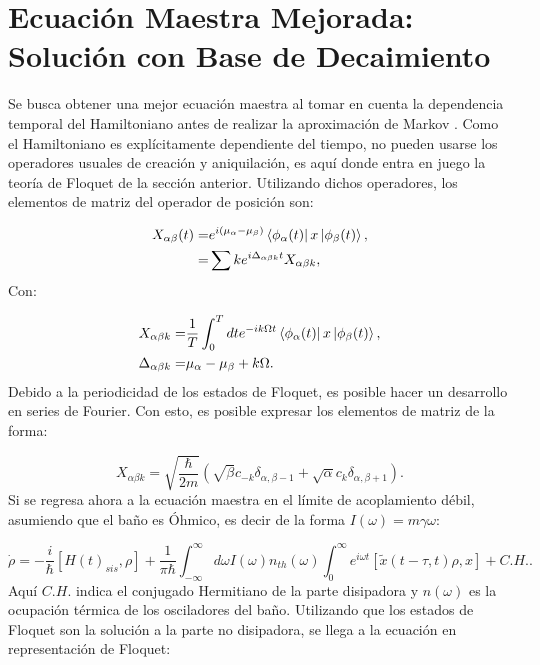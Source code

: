 \documentclass[a4paper,10pt]{report}
\begin{document}
\section{Ecuación Maestra Mejorada: Solución con Base de Decaimiento}

Se busca obtener una mejor ecuación maestra al tomar en cuenta la dependencia temporal del Hamiltoniano antes de realizar la aproximación de Markov \cite{HanngiDQS}. Como el Hamiltoniano es explícitamente dependiente del tiempo, no pueden usarse los operadores usuales de creación y aniquilación, es aquí donde entra en juego la teoría de Floquet de la sección anterior. Utilizando dichos operadores, los elementos de matriz del operador de posición son:

\begin{align}
X_{\alpha \beta}(t) =& e^{i(\mu_{\alpha}-\mu_{\beta})}\Bra{\phi_{\alpha}(t)}x\Ket{\phi_{\beta}(t)},\\
=& \sum{k} e^{i\Delta_{\alpha\beta k}t} X_{\alpha\beta k},
\end{align}Con:

\begin{align*}
X_{\alpha\beta k} =& \frac{1}{T} \int_0^T dt e^{-ik\Omega t}\Bra{\phi_{\alpha}(t)}x\Ket{\phi_{\beta}(t)}, \\
\Delta_{\alpha \beta k} =& \mu_{\alpha}-\mu_{\beta} + k\Omega.
\end{align*}Debido a la periodicidad de los estados de Floquet, es posible hacer un desarrollo en series de Fourier. Con esto, es posible expresar los elementos de matriz de la forma:

\begin{equation}
X_{\alpha\beta k} = \sqrt{\frac{\hbar}{2m}}(\sqrt{\beta}c_{-k} \delta_{\alpha,\beta-1}+\sqrt{\alpha}c_k\delta_{\alpha,\beta+1}).
\end{equation} Si se regresa ahora a la ecuación maestra en el límite de acoplamiento débil, asumiendo que el baño es Óhmico, es decir de la forma $I(\omega) = m\gamma \omega$:

\begin{equation}
\dot{\rho} = -\frac{i}{\hbar}[H(t)_{sis},\rho] + \frac{1}{\pi \hbar} \int_{-\infty}^\infty d\omega I(\omega)n_{th}(\omega)\int_0^\infty e^{i\omega t}[\tilde{x}(t-\tau,t)\rho,x] + C.H..
\end{equation}Aquí $C.H.$ indica el conjugado Hermitiano de la parte disipadora y $n(\omega)$ es la ocupación térmica de los osciladores del baño. Utilizando que los estados de Floquet son la solución a la parte no disipadora, se llega a la ecuación en representación de Floquet:
\end{document}
